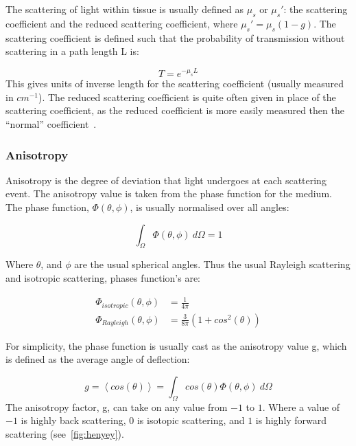 \medskip

The scattering of light within tissue is usually defined as $\mu_s$ or $\mu_s'$: the scattering coefficient and the reduced scattering coefficient, where $\mu_s'=\mu_s(1-g)$. The scattering coefficient is defined such that the probability of transmission without scattering in a path length L is:

\begin{equation}
	T=e^{-\mu_sL}
\end{equation}
This gives units of inverse length for the scattering coefficient (usually measured in $cm^{-1}$). The reduced scattering coefficient is quite often given in place of the scattering coefficient, as the reduced coefficient is more easily measured then the ``normal'' coefficient~\cite{jacques2013optical}.



\subsubsection*{Anisotropy}\label{sec:ansio}

Anisotropy is the degree of deviation that light undergoes at each scattering event. The anisotropy value is taken from the phase function for the medium. The phase function, $\Phi(\theta,\phi)$, is usually normalised over all angles:

\begin{equation}
	\int_{\Omega}\Phi(\theta,\phi)\ d\Omega = 1
\end{equation}

Where $\theta$, and $\phi$ are the usual spherical angles.
Thus the usual Rayleigh scattering and isotropic scattering, phases function's are:

\begin{align}
	\Phi_{isotropic}(\theta,\phi)&=\frac{1}{4\pi}\\
	\Phi_{Rayleigh}(\theta,\phi)&=\frac{3}{8\pi}(1+cos^2(\theta))
\end{align}

For simplicity, the phase function is usually cast as the anisotropy value g, which is defined as the average angle of deflection:

\begin{equation}
	g=\left<cos(\theta)\right>=\int_{\Omega}cos(\theta)\Phi(\theta,\phi)\ d\Omega
\end{equation}
The anisotropy factor, g, can take on any value from $-1$ to $1$. Where a value of $-1$ is highly back scattering, $0$ is isotopic scattering, and $1$ is highly forward scattering (see~\cref{fig:henyey}).



